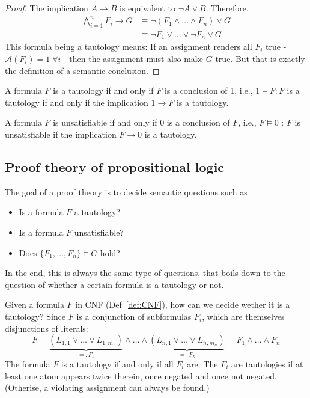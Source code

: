\begin{proof}
The implication $A \rightarrow B$ is equivalent to $\neg A \vee B$. Therefore,
$$
\begin{aligned}
\bigwedge_{i=1}^n F_i \rightarrow G & \equiv \neg\left(F_1 \wedge \ldots \wedge F_n\right) \vee G \\
& \equiv \neg F_1 \vee \ldots \vee \neg F_n \vee G
\end{aligned}
$$
This formula being a tautology means: If an assignment renders all $F_i$ true - $\mathcal{A}\left(F_i\right)=1 \; \forall i$ - then the assignment must also make $G$ true. 
But that is exactly the definition of a semantic conclusion.
\end{proof}

\begin{remark}
A formula $F$ is a tautology if and only if $F$ is a conclusion of 1, i.e., $1 \vDash F: F$ is a tautology if and only if the implication $1 \rightarrow F$ is a tautology.

A formula $F$ is unsatisfiable if and only if 0 is a conclusion of $F$, i.e., $F \vDash 0$ : $F$ is unsatisfiable if the implication $F \rightarrow 0$ is a tautology.
\end{remark}


\subsection{Proof theory of propositional logic}
The goal of a proof theory is to decide semantic questions such as
\begin{itemize}
  \item Is a formula $F$ a tautology?
  \item Is a formula $F$ unsatisfiable?
  \item Does $\{F_1, \ldots, F_n\} \models G$ hold?
\end{itemize}
In the end, this is always the same type of questions, that boils down to the question of whether a certain formula is a tautology or not.

\begin{example}
Given a formula $F$ in CNF (Def~\ref{def:CNF}), how can we decide wether it is a tautology?
Since $F$ is a conjunction of subformulas $F_i$, which are themselves disjunctions of literals:
$$
F = \underbrace{(L_{1,1} \vee \ldots \vee L_{1, m_1})}_{=: F_1} \wedge \ldots \wedge \underbrace{(L_{n, 1} \vee \ldots \vee L_{n, m_n})}_{=: F_n} = F_1 \wedge \ldots \wedge F_n
$$
The formula $F$ is a tautology if and only if all $F_i$ are.
The $F_i$ are tautologies if at least one atom appears twice therein, once negated and once not negated. (Otherise, a violating assignment can always be found.)
\end{example}

